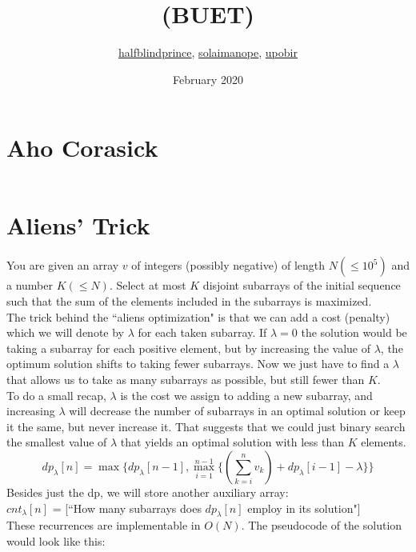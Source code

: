 \documentclass{article}
\title{\vspace{-4em}\bn{সমাহিত} (BUET)}
\author{\vspace{-3cm}
    \href{https://codeforces.com/profile/halfblindprince}{halfblindprince},
    \href{https://codeforces.com/profile/solaimanope}{solaimanope},
    \href{https://codeforces.com/profile/upobir}{upobir}}
\date{\vspace{-3em}February 2020}
\begin{document}
\begin{multicols}{3}[
	\maketitle
    \begin{center}
        \rule{\textwidth}{2pt}
    \end{center}
]

\section{Aho Corasick}
\inputminted{cpp}{src/AhoKorasick.cpp}

\section{Aliens' Trick}
You are given an array $v$ of integers (possibly negative) of length $N (\le 10^5)$ and a number $K (\le N)$. Select at most $K$ disjoint subarrays of the initial sequence such that the sum of the elements included in the subarrays is maximized. \\
The trick behind the ``aliens optimization" is that we can add a cost (penalty) which we will denote by $\lambda$ for each taken subarray. If $\lambda=0$ the solution would be taking a subarray for each positive element, but by increasing the value of $\lambda$, the optimum solution shifts to taking fewer subarrays. Now we just have to find a $\lambda$ that allows us to take as many subarrays as possible, but still fewer than $K$.\\
To do a small recap, $\lambda$ is the cost we assign to adding a new subarray, and increasing $\lambda$ will decrease the number of subarrays in an optimal solution or keep it the same, but never increase it. That suggests that we could just binary search the smallest value of $\lambda$ that yields an optimal solution with less than $K$ elements.
\begin{equation*}
	dp_{\lambda}[n] = \max \{ dp_{\lambda}[n-1], \max\limits_{i=1}^{n-1} \{ (\sum\limits_{k=i}^{n} v_k) + dp_{\lambda}[i-1] - \lambda \} \}
\end{equation*}
Besides just the dp, we will store another auxiliary array:\\
$cnt_{\lambda}[n]$ = [``How many subarrays does $dp_{\lambda}[n]$ employ in its solution"]\\
These recurrences are implementable in $O(N)$. The pseudocode of the solution would look like this:
\begin{verbatim}

\end{verbatim}
\end{multicols}
\end{document}
